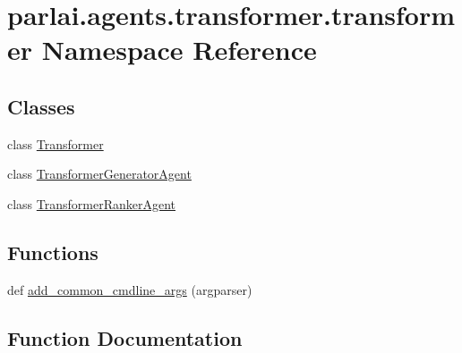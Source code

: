 \hypertarget{namespaceparlai_1_1agents_1_1transformer_1_1transformer}{}\section{parlai.\+agents.\+transformer.\+transformer Namespace Reference}
\label{namespaceparlai_1_1agents_1_1transformer_1_1transformer}
\subsection*{Classes}
\begin{DoxyCompactItemize}
\item 
class \hyperlink{classparlai_1_1agents_1_1transformer_1_1transformer_1_1Transformer}{Transformer}
\item 
class \hyperlink{classparlai_1_1agents_1_1transformer_1_1transformer_1_1TransformerGeneratorAgent}{Transformer\+Generator\+Agent}
\item 
class \hyperlink{classparlai_1_1agents_1_1transformer_1_1transformer_1_1TransformerRankerAgent}{Transformer\+Ranker\+Agent}
\end{DoxyCompactItemize}
\subsection*{Functions}
\begin{DoxyCompactItemize}
\item 
def \hyperlink{namespaceparlai_1_1agents_1_1transformer_1_1transformer_a916bc49d43dc0e244d24c47956c621ca}{add\+\_\+common\+\_\+cmdline\+\_\+args} (argparser)
\end{DoxyCompactItemize}


\subsection{Function Documentation}
\mbox{\label{namespaceparlai_1_1agents_1_1transformer_1_1transformer_a916bc49d43dc0e244d24c47956c621ca}} 
